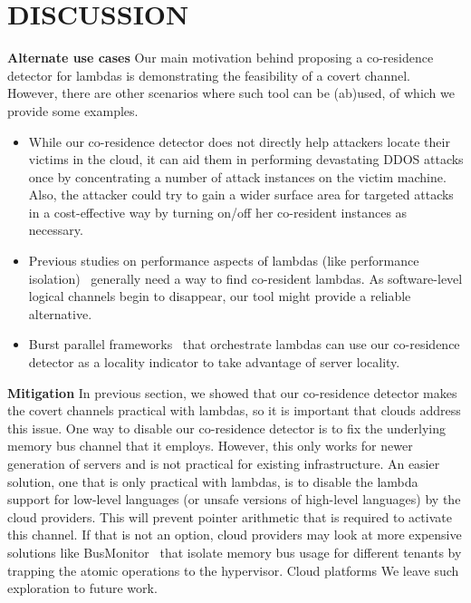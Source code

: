 \section{DISCUSSION}
\label{sec:discussion}
\textbf{Alternate use cases}
Our main motivation behind proposing a co-residence detector for lambdas is
demonstrating the feasibility of a covert channel. However, there are other
scenarios where such tool can be (ab)used, of which we provide some examples. 
\begin{itemize}
    \item While our co-residence detector does not directly help attackers
    locate their victims in the cloud, it can aid them in performing devastating 
    DDOS attacks once by concentrating a number of attack instances on the victim 
    machine. Also, the attacker could try to gain a wider surface area for 
    targeted attacks in a cost-effective way by turning on/off her co-resident 
    instances as necessary. 
    \item Previous studies on performance aspects of lambdas (like performance 
    isolation)~\cite{wangusenix2018} generally need a way to find co-resident
    lambdas. As software-level logical channels begin to disappear, our tool 
    might provide a reliable alternative.
    \item Burst parallel frameworks~\cite{234886} that orchestrate lambdas can
    use our co-residence detector as a locality indicator to take advantage of
    server locality.
\end{itemize}

\textbf{Mitigation}
In previous section, we showed that our co-residence detector makes the covert
channels practical with lambdas, so it is important that clouds address this
issue. One way to disable our co-residence detector is to fix the underlying
memory bus channel that it employs. However, this only works for newer
generation of servers and is not practical for existing infrastructure. An
easier solution, one that is only practical with lambdas, is to disable the
lambda support for low-level languages (or unsafe versions of high-level
languages) by the cloud providers. This will prevent pointer arithmetic that is
required to activate this channel. If that is not an option, cloud providers may look at
more expensive solutions like BusMonitor~\cite{MemoryBusMitigation} that isolate
memory bus usage for different tenants by trapping the atomic operations to the 
hypervisor. Cloud platforms    We leave such exploration to future
work.
